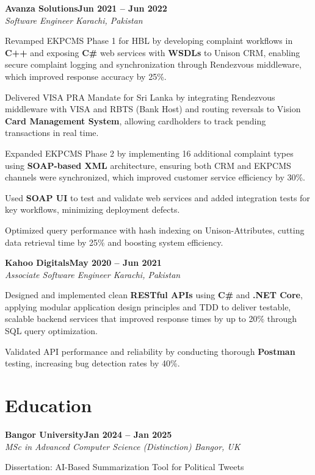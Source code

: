 \documentclass[letterpaper,10pt]{article}
\newcommand{\headingBf}[2]{
  \hspace{10pt}\textbf{#1}\hfill\textbf{#2}\\
}
\newcommand{\headingIt}[2]{
  \hspace{10pt}\textit{#1}\hfill\textit{#2}\\
}
\newenvironment{resume_list}{
  \vspace{-7pt}
  \begin{itemize}[itemsep=-2px, parsep=1pt, leftmargin=30pt]
}{
  \end{itemize}
}
\begin{document}
\headingBf{Avanza Solutions}{Jun 2021 -- Jun 2022}
\headingIt{Software Engineer \hfill Karachi, Pakistan}{}
\begin{resume_list}
    \item Revamped EKPCMS Phase 1 for HBL by developing complaint workflows in \textbf{C++} and exposing \textbf{C\#} web services with \textbf{WSDLs} to Unison CRM, enabling secure complaint logging and synchronization through Rendezvous middleware, which improved response accuracy by 25\%.
    \item Delivered VISA PRA Mandate for Sri Lanka by integrating Rendezvous middleware with VISA and RBTS (Bank Host) and routing reversals to Vision \textbf{Card Management System}, allowing cardholders to track pending transactions in real time.
    \item Expanded EKPCMS Phase 2 by implementing 16 additional complaint types using \textbf{SOAP-based XML} architecture, ensuring both CRM and EKPCMS channels were synchronized, which improved customer service efficiency by 30\%.
    \item Used \textbf{SOAP UI} to test and validate web services and added integration tests for key workflows, minimizing deployment defects.
    \item Optimized query performance with hash indexing on Unison-Attributes, cutting data retrieval time by 25\% and boosting system efficiency.
\end{resume_list}

\headingBf{Kahoo Digitals}{May 2020 -- Jun 2021}
\headingIt{Associate Software Engineer \hfill Karachi, Pakistan}{}
\begin{resume_list}
    \item Designed and implemented clean \textbf{RESTful APIs} using \textbf{C\#} and \textbf{.NET Core}, applying modular application design principles and TDD to deliver testable, scalable backend services that improved response times by up to 20\% through SQL query optimization.
    \item Validated API performance and reliability by conducting thorough \textbf{Postman} testing, increasing bug detection rates by 40\%.
\end{resume_list}

\section{Education}

\headingBf{Bangor University}{Jan 2024 -- Jan 2025}
\headingIt{MSc in Advanced Computer Science (Distinction) \hfill Bangor, UK}{}
\begin{resume_list}
    \item Dissertation: AI-Based Summarization Tool for Political Tweets
\end{resume_list}
\end{document}
